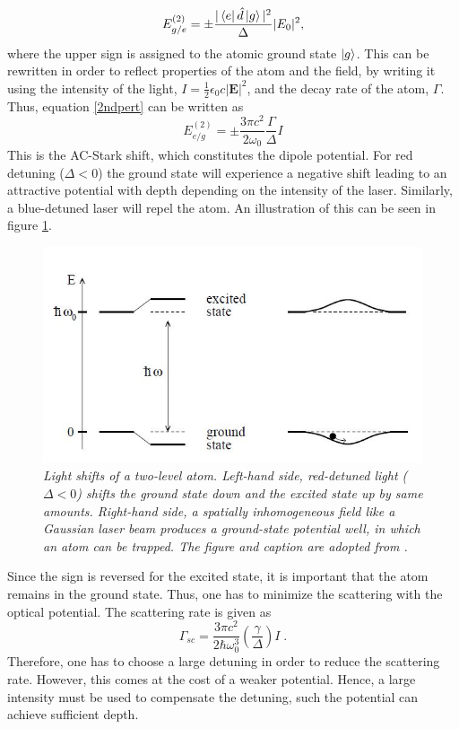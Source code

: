 \begin{equation}
	E_{g/e}^{(2)}=\pm  \frac{ |\bra{e}\hat{d}\ket{g}|^2}{\Delta} |E_0|^2,
	\label{2ndpert}
\end{equation}
where the upper sign is assigned to the atomic ground state $\ket{g}$. This can be rewritten in order to reflect properties of the atom and the field, by writing it using the intensity of the light, $I = \frac{1}{2} \epsilon_0 c |\boldsymbol{E}|^2 $, and the decay rate of the atom, $\Gamma$. Thus, equation \ref{2ndpert} can be written as \cite{grimm} 
\begin{equation}
	E_{e/g}^{(2)}=\pm \frac{3 \pi c^2}{2 \omega_0} \frac{\Gamma}{\Delta}I
	\label{eq:dipolepot}
\end{equation}
This is the AC-Stark shift, which constitutes the dipole potential. For red detuning ($\Delta < 0$) the ground state will experience a negative shift leading to an attractive potential with depth depending on the intensity of the laser. Similarly, a blue-detuned laser will repel the atom. An illustration of this can be seen in figure \ref{fig:ac_stark}.
\begin{figure}[!h]
	\centering
	\includegraphics[width=0.5\columnwidth]{Figures/acstark.JPG} 
	\caption{\textit{Light shifts of a two-level atom. Left-hand side,
		red-detuned light ($\Delta < 0$) shifts the ground state down and the
		excited state up by same amounts. Right-hand side, a spatially
		inhomogeneous field like a Gaussian laser beam produces a
		ground-state potential well, in which an atom can be trapped. The figure and 		caption are adopted from \cite{grimm}.}}
	\label{fig:ac_stark} 
\end{figure}
Since the sign is reversed for the excited state, it is important that the atom remains in the ground state. Thus, one has to minimize the scattering with the optical potential. The scattering rate is given as \cite{grimm}
\begin{equation}
	\Gamma_{sc} = \frac{3 \pi c^2}{2 \hbar \omega_{0}^3} \left( \frac{\gamma}{\Delta} \right) I \; .
\end{equation}
Therefore, one has to choose a large detuning in order to reduce the scattering rate. However, this comes at the cost of a weaker potential. Hence, a large intensity must be used to compensate the detuning, such the potential can achieve sufficient depth.


